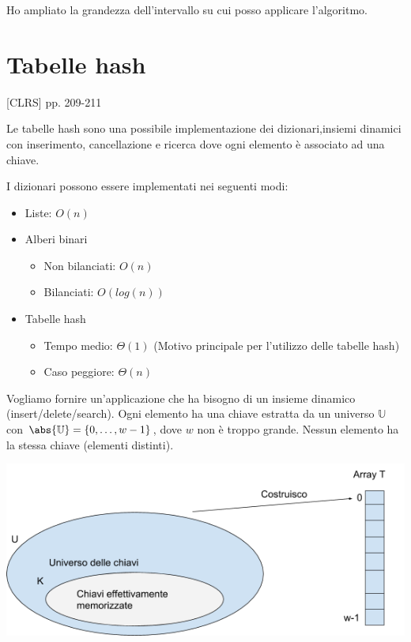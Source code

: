 \documentclass[tikz]{article}
\providecommand{\tightlist}{%
  \setlength{\itemsep}{0pt}\setlength{\parskip}{0pt}}
\begin{document}
{Ho ampliato la grandezza dell'intervallo su cui posso applicare l'algoritmo.}

\section{Tabelle hash}

{{[}CLRS{]} pp. 209-211}

{Le tabelle hash sono una possibile implementazione dei dizionari,insiemi dinamici con inserimento, cancellazione e ricerca dove ogni elemento è associato ad una chiave.}

{I dizionari possono essere implementati nei seguenti modi:}

\begin{itemize}
\tightlist
\item
  {Liste: $O(n)$}
\item
	{Alberi binari}
	
\begin{itemize}
\tightlist
\item
  	{Non bilanciati: $O(n)$}
\item
  	{Bilanciati: $O(log(n))$}
\end{itemize}

\item
  	{Tabelle hash}
  	
\begin{itemize}
\tightlist
\item
	{Tempo medio: $\Theta(1)$ (Motivo principale per l'utilizzo delle tabelle hash)}
\item
	{Caso peggiore: $\Theta(n)$}
\end{itemize}

\end{itemize}

{Vogliamo fornire un'applicazione che ha bisogno di un insieme dinamico (insert/delete/search). Ogni elemento ha una chiave estratta da un universo $\mathbb{U}$ con $\abs{\mathbb{U}} = \{0,\ldots,w-1\}$, dove $w$ non è troppo grande. Nessun elemento ha la stessa chiave (elementi distinti). }

{\includegraphics{images/image521.png}}
\end{document}
